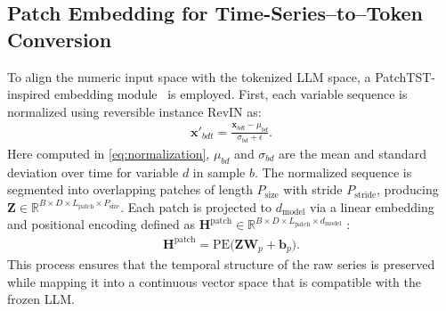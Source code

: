 \documentclass[conference]{IEEEtran}
\begin{document}
\subsection{Patch Embedding for Time-Series--to--Token Conversion}
To align the numeric input space with the tokenized LLM space, a PatchTST-inspired embedding module~\cite{PatchTST} is employed.
First, each variable sequence is normalized using reversible instance RevIN as:
\begin{align}
\mathbf{x}'_{bdt} = \frac{\mathbf{x}_{bdt} - \mu_{bd}}{\sigma_{bd} + \epsilon}.
\label{eq:normalization}
\end{align}
Here computed in \eqref{eq:normalization}, $\mu_{bd}$ and $\sigma_{bd}$ are the mean and standard deviation over time for variable $d$ in sample $b$.
The normalized sequence is segmented into overlapping patches of length $P_{\text{size}}$ with stride $P_{\text{stride}}$, producing
$\mathbf{Z} \in \mathbb{R}^{B \times D \times L_{\text{patch}} \times P_{\text{size}}}$.
Each patch is projected to $d_{\text{model}}$ via a linear embedding and positional encoding defined as \(\mathbf{H}^{\text{patch}} \in \mathbb{R}^{B \times D \times L_{\text{patch}} \times d_{\text{model}}}\) :
\begin{align}
\mathbf{H}^{\text{patch}} = \text{PE}\big(\mathbf{Z} \mathbf{W}_p + \mathbf{b}_p\big).
\label{eq:positional-encoding}
\end{align}
This process ensures that the temporal structure of the raw series is preserved while mapping it into a continuous vector space that is compatible with the frozen LLM.
\end{document}
